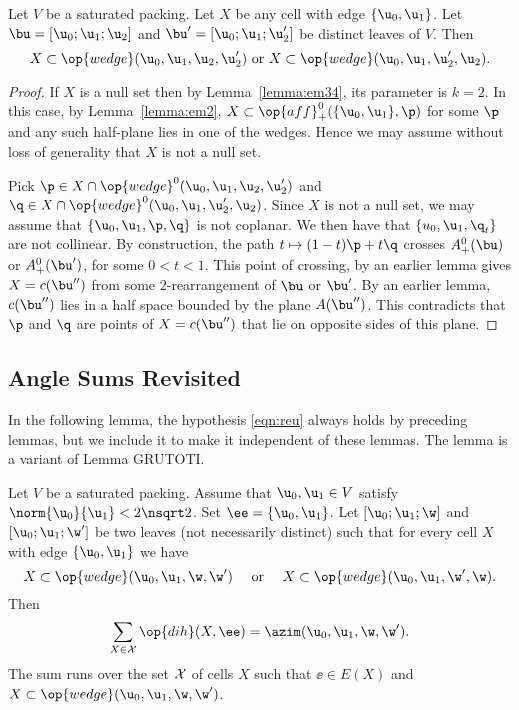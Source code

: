 \begin{lemma} Let $V$ be a saturated packing.  Let $X$ be any cell with edge $\{\u_0,\u_1\}$.
Let $\bu=[\u_0;\u_1;\u_2]$ and $\bu'=[\u_0;\u_1;\u_2']$ be distinct leaves of $V$. Then
\[
X \subset \op{wedge}(\u_0,\u_1,\u_2,\u_2') \text{ or } X \subset\op{wedge}(\u_0,\u_1,\u_2',\u_2).
\]
\end{lemma}

\begin{proof}  If $X$ is a null set then by Lemma~\ref{lemma:em34}, its parameter is $k=2$.
In this case, by Lemma~\ref{lemma:em2}, $X\subset \op{aff}_+^0(\{\u_0,\u_1\},\p)$ for some $\p$
and any such half-plane lies in one of the wedges.   Hence we may assume without loss of generality
that $X$ is not a null set.

Pick $\p\in X\cap \op{wedge}^0 (\u_0,\u_1,\u_2,\u_2')$ and $\q\in X\cap \op{wedge}^0(\u_0,\u_1,\u_2',\u_2)$.
Since $X$ is not a null set, we may assume that $\{\u_0,\u_1,\p,\q\}$ is not coplanar.
We then have that $\{u_0,\u_1,\q_t\}$ are not collinear.
By construction, the path $t\mapsto  (1-t) \p + t \q$ crosses $A_+^0(\bu)$ or $A_+^0(\bu')$, for some $0<t<1$.
This point of crossing, by an earlier lemma gives $X=c(\bu'')$ from some $2$-rearrangement of $\bu$ or $\bu'$.
By an earlier lemma, $c(\bu'')$ lies in a half space bounded by the plane $A(\bu'')$.  This contradicts that
$\p$ and $\q$ are points of $X = c(\bu'')$ that lie on opposite sides of this plane.
\end{proof}

\subsection{Angle Sums Revisited}

In the following lemma, the hypothesis \eqref{eqn:reu} always holds by preceding lemmas,
but we include it to make it independent of these lemmas.   The lemma is a  variant of Lemma GRUTOTI.


\begin{lemma}
  Let $V$ be a saturated packing.  Assume that $\u_0,\u_1\in V$
  satisfy $\norm{\u_0}{\u_1}<2\nsqrt2$.  Set $\ee=\{\u_0,\u_1\}$.  
Let $[\u_0;\u_1;\w]$ and $[\u_0;\u_1;\w']$ be two leaves (not necessarily distinct) such
that for every cell $X$ with edge $\{\u_0,\u_1\}$ we have
\begin{equation}\label{eqn:reu}
X\subset \op{wedge}(\u_0,\u_1,\w,\w')\quad\text{ or } \quad
X\subset \op{wedge}(\u_0,\u_1,\w',\w).
\end{equation}
Then 
\[
\sum_{X\in\cX} \op{dih}(X,\ee) = \azim(\u_0,\u_1,\w,\w').
\]
The sum runs over the set ${\mathcal X}$ of
 cells $X$ such that $\ee\in E(X)$ and $X \subset \op{wedge}(\u_0,\u_1,\w,\w') $.
\end{lemma}

